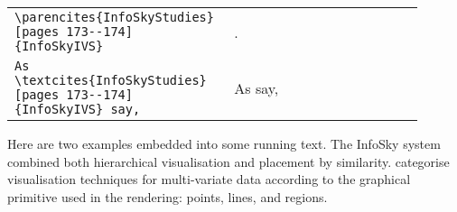 \begin{itemize}
            \begin{small}
                  \hspace{2\parindent}
                  \renewcommand{\arraystretch}{1.5}
                  \begin{tabular}{p{0.45\linewidth}p{0.45\linewidth}}
                        \lstinline|\parencites{InfoSkyStudies}[pages 173--174]{InfoSkyIVS}| &
                        \parencites{InfoSkyStudies}[pages 173--174]{InfoSkyIVS}. \\
                        \lstinline|As \textcites{InfoSkyStudies}[pages 173--174]{InfoSkyIVS} say,| &
                        As \textcites{InfoSkyStudies}[pages 173--174]{InfoSkyIVS} say,
                  \end{tabular}
            \end{small}


\end{itemize}


Here are two examples embedded into some running text. The InfoSky
\parencite{InfoSkyIVS} system combined both hierarchical visualisation
and placement by similarity.
\textcite[Chapter~7]{InteractiveDataVisualisation} categorise
visualisation techniques for multi-variate data according to the
graphical primitive used in the rendering: points, lines, and regions.









